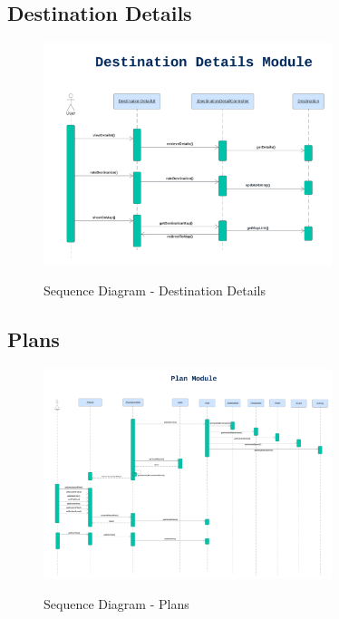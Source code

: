 \documentclass[12pt]{article}
\begin{document}
\subsection{Destination Details}
\begin{figure}[H]
    \centering
        \includegraphics[width=0.75\textwidth]{Sequence Diagram/DestinationDetail.png}
        \label{fig:SeqDestDetails}
    \caption{Sequence Diagram - Destination Details}
\end{figure}

\newpage
\subsection{Plans}
\begin{figure}[H]
    \centering
        \includegraphics[width=0.75\textwidth]{Sequence Diagram/Plan.png}
        \label{fig:SeqPlans}
    \caption{Sequence Diagram - Plans}
\end{figure}
\end{document}
